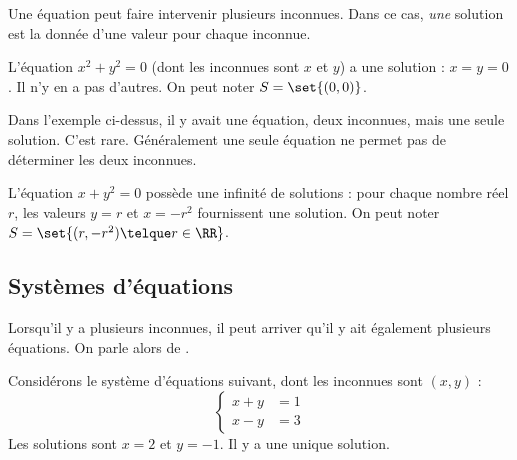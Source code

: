 \begin{frame}
  Une équation peut faire intervenir plusieurs inconnues. Dans ce cas, \emph{une} solution est la donnée d'une valeur pour chaque inconnue.\pause
  \begin{example}
    L'équation \(x^{2}+y^{2} = 0\) (dont les inconnues sont \(x\) et \(y\)) a une solution : \(x = y = 0\). Il n'y en a pas d'autres. On peut noter \(S = \set{(0,0)}\).
  \end{example}\pause
  Dans l'exemple ci-dessus, il y avait une équation, deux inconnues, mais une seule solution. C'est rare. Généralement une seule équation ne permet pas de déterminer les deux inconnues.\pause
  \begin{example}
    L'équation \(x+ y^{2} = 0\) possède une infinité de solutions : pour chaque nombre réel \(r\), les valeurs \(y = r\) et \(x = -r^{2}\) fournissent une solution. On peut noter \(S = \set{(r,-r^{2}) \telque r \in \RR}\).
  \end{example}
\end{frame}

\subsection{Systèmes d'équations}
\begin{frame}
Lorsqu'il y a plusieurs inconnues, il peut arriver qu'il y ait également plusieurs équations. On parle alors de .\pause
\begin{example}
  Considérons le système d'équations suivant, dont les inconnues sont \((x,y)\) :
  \begin{equation*}
    \begin{cases}
      x + y &= 1\\
      x - y &= 3
    \end{cases}
  \end{equation*}
  Les solutions sont \(x = 2\) et \(y = -1\). Il y a une unique solution.
\end{example}
\end{frame}

